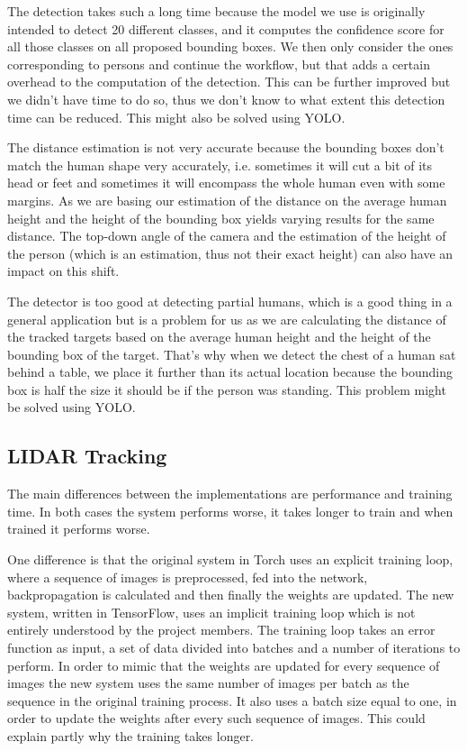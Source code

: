 \documentclass[a4paper]{article}
\begin{document}
The detection takes such a long time because the model we use is originally intended
to detect 20 different classes, and it computes the confidence score for all
those classes on all proposed bounding boxes. We then only consider the ones corresponding
to persons and continue the workflow, but that adds a certain overhead to the computation
of the detection. This can be further improved but we didn't have time to do so,
thus we don't know to what extent this detection time can be reduced. This might
also be solved using YOLO.

The distance estimation is not very accurate because the bounding boxes don't
match the human shape very accurately, i.e. sometimes it will cut a bit of its head
or feet and sometimes it will encompass the whole human even with some margins.
As we are basing our estimation of the distance on the average human height and
the height of the bounding box yields varying results for the same distance. The top-down angle of the camera and the estimation of the height of the person (which is an estimation,
thus not their exact height) can also have an impact on this shift.

The detector is too good at detecting partial humans, which is a good thing in a
general application but is a problem for us as we are calculating the distance of
the tracked targets based on the average human height and the height of the bounding
box of the target. That's why when we detect the chest of a human sat behind a table,
we place it further than its actual location because the bounding box is half
the size it should be if the person was standing. This problem might be solved using YOLO.

\subsection{LIDAR Tracking}

The main differences between the implementations are performance and training time.
In both cases the system performs worse, it takes longer to train and when trained it performs worse.

One difference is that the original system in Torch uses an explicit training loop, where a sequence of images is preprocessed, fed into the network, backpropagation is calculated and then finally the weights are updated.
The new system, written in TensorFlow, uses an implicit training loop which is not entirely understood by the project members.
The training loop takes an error function as input, a set of data divided into batches and a number of iterations to perform.
In order to mimic that the weights are updated for every sequence of images the new system uses the same number of images per batch as the sequence in the original training process.
It also uses a batch size equal to one, in order to update the weights after every such sequence of images.
This could explain partly why the training takes longer.
\end{document}
